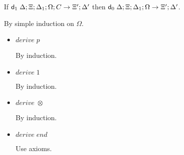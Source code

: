 If $\mathsf{d}_1 \; \Delta; \Xi; \Delta_1; \Omega; C \rightarrow \Xi'; \Delta'$ then $\mathsf{d}_0 \; \Delta; \Xi; \Delta_1; \Omega \rightarrow \Xi'; \Delta'$.

By simple induction on $\Omega$.

\begin{itemize}
   \item $derive \; p$
   
   By induction.
   
   \item $derive \; 1$
   
   By induction.
   
   \item $derive \; \otimes$
   
   By induction.
   
   \item $derive \; end$
   
   Use axioms.
   
\end{itemize}